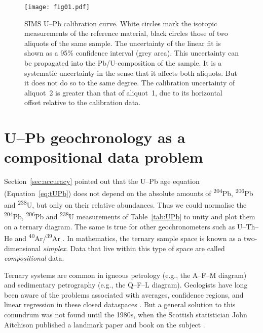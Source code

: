 \documentclass{article}
\begin{document}
\begin{figure}
  \begin{minipage}[c]{0.5\textwidth}
    \texttt{[image: fig01.pdf]}
  \end{minipage}\hfill
  \begin{minipage}[c]{0.45\textwidth}
    \caption{SIMS U--Pb calibration curve. White circles mark the
      isotopic measurements of the reference material, black circles
      those of two aliquots of the same sample. The uncertainty of the
      linear fit is shown as a 95\% confidence interval (grey area).
      This uncertainty can be propagated into the Pb/U-composition of
      the sample. It is a systematic uncertainty in the sense that it
      affects both aliquots. But it does not do so to the same
      degree. The calibration uncertainty of aliquot~2 is greater than
      that of aliquot~1, due to its horizontal offset relative to the
      calibration data.}
    \label{fig:syserr}
  \end{minipage}
\end{figure}

\section{U--Pb geochronology as a compositional data problem}
\label{sec:compositional}

Section~\ref{sec:accuracy} pointed out that the U--Pb age equation
(Equation~\ref{eq:tUPb}) does not depend on the absolute amounts of
\textsuperscript{204}Pb, \textsuperscript{206}Pb and
\textsuperscript{238}U, but only on their relative abundances.  Thus
we could normalise the \textsuperscript{204}Pb,
\textsuperscript{206}Pb and \textsuperscript{238}U measurements of
Table~\ref{tab:UPb} to unity and plot them on a ternary diagram.  The
same is true for other geochronometers such as U--Th--He and
\textsuperscript{40}Ar/\textsuperscript{39}Ar
\citep{vermeesch2010a,vermeesch2015b}. In mathematics, the ternary
sample space is known as a two-dimensional \textit{simplex}. Data that
live within this type of space are called \emph{compositional}
data.\medskip

Ternary systems are common in igneous petrology (e.g., the A--F--M
diagram) and sedimentary petrography (e.g., the Q--F--L
diagram). Geologists have long been aware of the problems associated
with averages, confidence regions, and linear regression in these
closed dataspaces \citep{chayes1949, chayes1960}.  But a general
solution to this conundrum was not found until the 1980s, when the
Scottish statistician John Aitchison published a landmark paper and
book on the subject \citep{aitchison1982, aitchison1986}.\medskip
\end{document}
